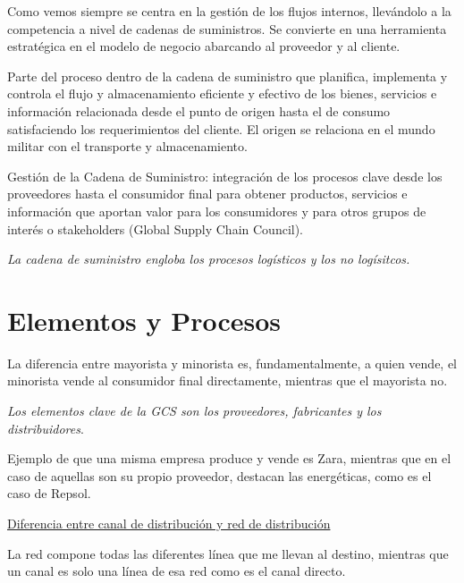 \documentclass[12pt]{book} %
\begin{document}
Como vemos siempre se centra en la gestión de los flujos internos,
llevándolo a la competencia a nivel de cadenas de suministros. Se
convierte en una herramienta estratégica en el modelo de negocio
abarcando al proveedor y al cliente.

\begin{definicion}[Logística]
Parte del proceso dentro de la cadena de suministro que planifica, implementa y controla el flujo y almacenamiento eficiente y efectivo de los bienes, servicios e información relacionada desde el punto de origen hasta el de consumo satisfaciendo los requerimientos del cliente. El origen se relaciona en el mundo militar con el transporte y almacenamiento.
\end{definicion}

\begin{definicion}
Gestión de la Cadena de Suministro: integración de los procesos clave desde los proveedores hasta el consumidor final para obtener productos, servicios e información que aportan valor para los consumidores y para otros grupos de interés o stakeholders (Global Supply Chain Council).
\end{definicion}

\emph{La cadena de suministro engloba los procesos logísticos y los no
logísitcos.}


\hypertarget{elementos-y-procesos}{%
\section{Elementos y Procesos}\label{elementos-y-procesos}}

La diferencia entre mayorista y minorista es, fundamentalmente, a quien
vende, el minorista vende al consumidor final directamente, mientras que
el mayorista no.

\emph{Los elementos clave de la GCS son los proveedores, fabricantes y
los distribuidores}.

Ejemplo de que una misma empresa produce y vende es Zara, mientras que
en el caso de aquellas son su propio proveedor, destacan las
energéticas, como es el caso de Repsol.

\underline{Diferencia entre canal de distribución y red de distribución}

La red compone todas las diferentes línea que me llevan al destino,
mientras que un canal es solo una línea de esa red como es el canal
directo.
\end{document}
